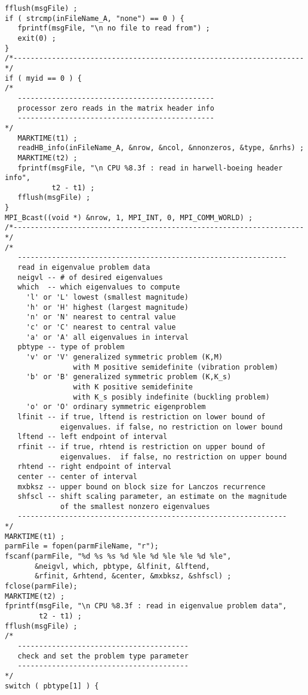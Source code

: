 \begin{verbatim}
fflush(msgFile) ;
if ( strcmp(inFileName_A, "none") == 0 ) {
   fprintf(msgFile, "\n no file to read from") ;
   exit(0) ;
}
/*--------------------------------------------------------------------*/
if ( myid == 0 ) {
/*
   ----------------------------------------------
   processor zero reads in the matrix header info
   ----------------------------------------------
*/
   MARKTIME(t1) ;
   readHB_info(inFileName_A, &nrow, &ncol, &nnonzeros, &type, &nrhs) ;
   MARKTIME(t2) ;
   fprintf(msgFile, "\n CPU %8.3f : read in harwell-boeing header info",
           t2 - t1) ;
   fflush(msgFile) ;
}
MPI_Bcast((void *) &nrow, 1, MPI_INT, 0, MPI_COMM_WORLD) ;
/*--------------------------------------------------------------------*/
/*
   ---------------------------------------------------------------
   read in eigenvalue problem data
   neigvl -- # of desired eigenvalues
   which  -- which eigenvalues to compute
     'l' or 'L' lowest (smallest magnitude)
     'h' or 'H' highest (largest magnitude)
     'n' or 'N' nearest to central value
     'c' or 'C' nearest to central value
     'a' or 'A' all eigenvalues in interval
   pbtype -- type of problem
     'v' or 'V' generalized symmetric problem (K,M)
                with M positive semidefinite (vibration problem)
     'b' or 'B' generalized symmetric problem (K,K_s)
                with K positive semidefinite
                with K_s posibly indefinite (buckling problem)
     'o' or 'O' ordinary symmetric eigenproblem
   lfinit -- if true, lftend is restriction on lower bound of
             eigenvalues. if false, no restriction on lower bound
   lftend -- left endpoint of interval
   rfinit -- if true, rhtend is restriction on upper bound of
             eigenvalues.  if false, no restriction on upper bound
   rhtend -- right endpoint of interval
   center -- center of interval
   mxbksz -- upper bound on block size for Lanczos recurrence
   shfscl -- shift scaling parameter, an estimate on the magnitude
             of the smallest nonzero eigenvalues
   ---------------------------------------------------------------
*/
MARKTIME(t1) ;
parmFile = fopen(parmFileName, "r");
fscanf(parmFile, "%d %s %s %d %le %d %le %le %d %le",
       &neigvl, which, pbtype, &lfinit, &lftend,
       &rfinit, &rhtend, &center, &mxbksz, &shfscl) ;
fclose(parmFile);
MARKTIME(t2) ;
fprintf(msgFile, "\n CPU %8.3f : read in eigenvalue problem data",
        t2 - t1) ;
fflush(msgFile) ;
/*
   ----------------------------------------
   check and set the problem type parameter
   ----------------------------------------
*/
switch ( pbtype[1] ) {

\end{verbatim}
